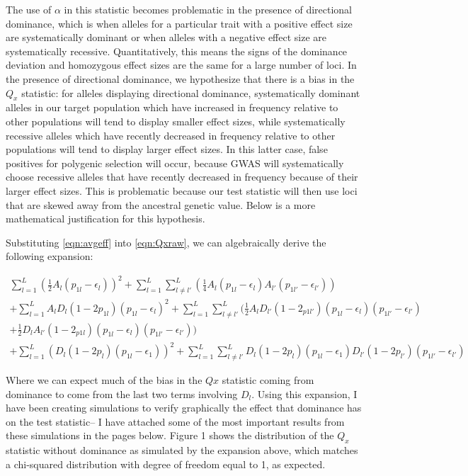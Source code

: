 \documentclass[a4paper,10pt]{article}
\begin{document}
The use of $\alpha$ in this statistic becomes problematic in the
presence of directional dominance, which is when alleles for a
particular trait with a positive effect size are systematically
dominant or when alleles with a negative effect size are
systematically recessive. Quantitatively, this means the signs of the
dominance deviation and homozygous effect sizes are the same for a
large number of loci. In the presence of directional dominance, we
hypothesize that there is a bias in the $Q_x$ statistic: for alleles
displaying directional dominance, systematically dominant alleles in
our target population which have increased in frequency relative to
other populations  will tend to display smaller effect sizes, while
systematically recessive alleles which have recently decreased in
frequency relative to other populations will tend to display larger
effect sizes. In this latter case, false positives for polygenic
selection will occur, because GWAS will systematically choose
recessive alleles that have recently decreased in frequency because of
their larger effect sizes. This is problematic because our test
statistic will then use loci that are
skewed away from the ancestral genetic value. Below is a more mathematical justification for this hypothesis.

Substituting \eqref{eqn:avgeff} into \eqref{eqn:Qxraw}, we can
algebraically derive the following expansion:

\begin{equation}
  \begin{split}
  \sum^L_{l=1}( \frac{1}{2}A_l(p_{1l}-\epsilon_l))^2+\sum^L_{l=1}\sum^L_{
    l \neq l'}(\frac{1}{4}A_l(p_{1l}-\epsilon_{l})A_{l'}(p_{1l'}-\epsilon_{l'}))
  \\
  +\sum^L_{l=1}A_lD_l(1-2p_{1l})(p_{1l}-\epsilon_l)^2 +
  \sum^L_{l=1}\sum^L_{l \neq
    l'}(\frac{1}{2}A_lD_{l'}(1-2_{p1l'})(p_{1l}-\epsilon_l)(p_{1l'}-\epsilon_{l'}) \\
  + \frac{1}{2}D_lA_{l'}(1-2_{p1l})(p_{1l}-\epsilon_l)(p_{1l'}-\epsilon_{l'})) \\
   + \sum^L_{l=1} (D_l(1-2p_l)(p_{1l}-\epsilon_{1}))^2
   + \sum^L_{l=1}\sum^L_{l \neq
     l'}D_{l}(1-2p_{l})(p_{1l}-\epsilon_{1})D_{l'}(1-2p_{l'})(p_{1l'}-\epsilon_{l'}) \label{second_exp_ult}
  \end{split}
\end{equation}

Where we can expect much of the bias in the $Qx$ statistic coming from
dominance to come from the last two terms involving $D_l$. Using this
expansion, I have been creating simulations to verify graphically the
effect that dominance has on the test statistic-- I have attached some
of the most important results from these simulations in the pages
below. Figure 1 shows the distribution of the $Q_x$ statistic without dominance as simulated by
the expansion above, which matches a chi-squared distribution with
degree of freedom equal to 1, as expected.
\end{document}
